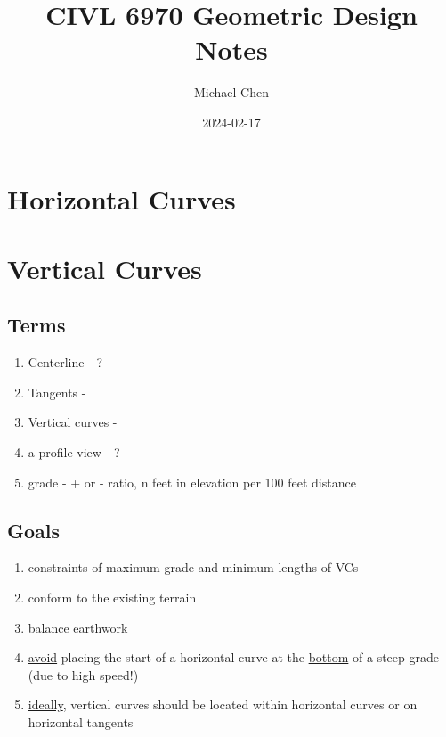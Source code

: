 \documentclass{article}   %
\title{CIVL 6970 Geometric Design Notes}
\date{2024-02-17}
\author{Michael Chen}
\begin{document}
  \maketitle
  \newpage


  \tableofcontents
  \newpage






  \section{Horizontal Curves}

  \section{Vertical Curves}

  \subsection{Terms} 
  \begin{enumerate}
    \item Centerline - ?
    \item Tangents - 
    \item Vertical curves -
    \item a profile view - ?
    \item grade - + or - ratio, n feet in elevation per 100 feet distance
    
  \end{enumerate}

  \subsection{Goals}
  \begin{enumerate}
    \item constraints of maximum grade and minimum lengths of VCs
    \item conform to the existing terrain
    \item balance earthwork
    \item \underline{avoid} placing the start of a horizontal curve at the \underline{bottom} of a steep grade (due to high speed!)
    \item \underline{ideally}, vertical curves should be located within horizontal curves or on horizontal tangents
  \end{enumerate}
\end{document}
